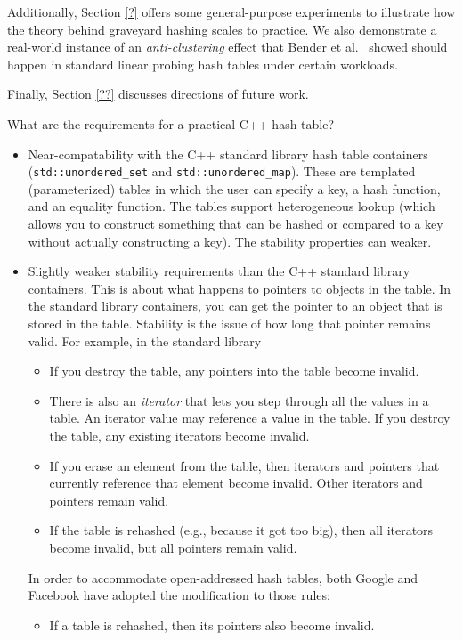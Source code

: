 \documentclass[10pt]{article}
\theoremstyle{remark}
\theoremstyle{remark}
\begin{document}
Additionally, Section \ref{?} offers some general-purpose experiments to illustrate how the theory behind graveyard hashing scales to practice. We also demonstrate a real-world instance of an \emph{anti-clustering} effect that Bender et al.~\cite{?} showed should happen in standard linear probing hash tables under certain workloads. 

Finally, Section \ref{??} discusses directions of future work.

\newpage

What are the requirements for a practical C++ hash table?
\begin{itemize}
\item Near-compatability with the C++ standard library hash table
  containers (\texttt{std::unordered\_set} and
  \texttt{std::unordered\_map}).  These are templated (parameterized)
  tables in which the user can specify a key, a hash function, and an
  equality function.  The tables support heterogeneous lookup (which
  allows you to construct something that can be hashed or compared to
  a key without actually constructing a key).  The stability
  properties can weaker.
    
\item Slightly weaker stability requirements than the C++ standard library containers.  This is about what happens to pointers to objects in the table.  In the standard library containers, you can get the pointer to an object that is stored in the table. Stability is the issue of how long that pointer remains valid.  For example, in the standard library
  \begin{itemize}
    \item If you destroy the table, any pointers into the table become invalid.
    \item There is also an \textit{iterator} that lets you step
      through all the values in a table.  An iterator value may
      reference a value in the table.  If you destroy the table, any
      existing iterators become invalid.
    \item If you erase an element from the table, then iterators and
      pointers that currently reference that element become invalid.
      Other iterators and pointers remain valid.
    \item If the table is rehashed (e.g., because it got too big),
      then all iterators become invalid, but all pointers remain valid.
   \end{itemize}

  In order to accommodate open-addressed hash tables, both Google and
  Facebook have adopted the modification to those rules:
  \begin{itemize}
  \item  If a table is rehashed, then its pointers also become invalid.
  \end{itemize}


\end{itemize}
\end{document}
